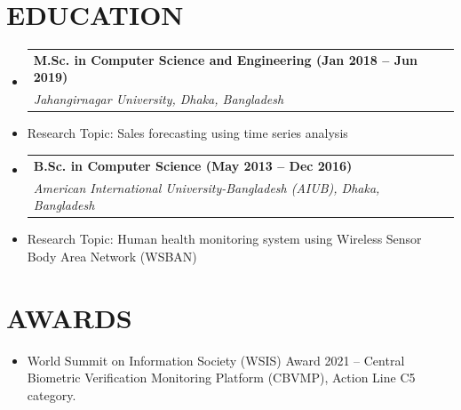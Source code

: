 ﻿\documentclass[letterpaper,10pt]{article}
\makeatletter
\newcommand{\resumeItem}[1]{\item\small{#1}}
\newcommand{\resumeSubheading}[4]{
\vspace{-1pt}\item
  \begin{tabular*}{0.97\textwidth}[t]{l@{\extracolsep{\fill}}r}
    \textbf{#1} & #2 \\
    \textit{#3} & \textit{#4} \\
  \end{tabular*}\vspace{-7pt}
}
\newcommand{\resumeSubHeadingList}{\begin{itemize}[leftmargin=0.15in, label={}]}
\newcommand{\resumeSubHeadingListEnd}{\end{itemize}}
\makeatother
\begin{document}
\section{EDUCATION}
\resumeSubHeadingList
  \resumeSubheading
    {M.Sc. in Computer Science and Engineering (Jan 2018 -- Jun 2019)}{}
    {Jahangirnagar University, Dhaka, Bangladesh}{}
    \resumeItem{Research Topic: Sales forecasting using time series analysis}
  \resumeSubheading
    {B.Sc. in Computer Science (May 2013 -- Dec 2016)}{}
    {American International University-Bangladesh (AIUB), Dhaka, Bangladesh}{}
    \resumeItem{Research Topic: Human health monitoring system using Wireless Sensor Body Area Network (WSBAN)}
\resumeSubHeadingListEnd

\section{AWARDS}
\resumeSubHeadingList
  \resumeItem{World Summit on Information Society (WSIS) Award 2021 -- Central Biometric Verification Monitoring Platform (CBVMP), Action Line C5 category.}
\resumeSubHeadingListEnd

\end{document}

